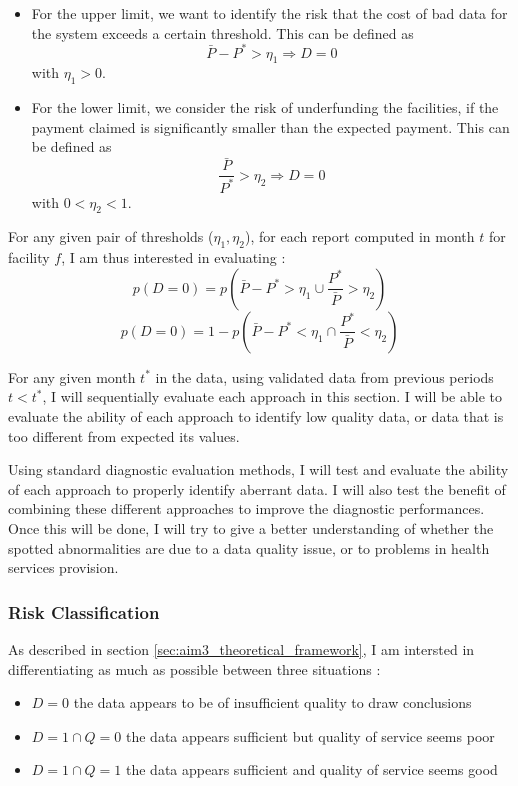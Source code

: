\begin{itemize}
\item For the upper limit, we want to identify the risk that the cost of bad data for the system exceeds a certain threshold. This can be defined as
$$ \bar{P} - P^{*} > \eta_1 \Rightarrow D = 0$$
with $\eta_1 > 0 $.

\item For the lower limit, we consider the risk of underfunding the facilities, if the payment claimed is significantly smaller than the expected payment. This can be defined as
$$  \frac{\bar{P}}{P^{*}} > \eta_2 \Rightarrow D = 0$$
with $0 < \eta_2 < 1 $.
\end{itemize}

For any given pair of thresholds ($\eta_1 , \eta_2$), for each report computed in month $t$ for facility $f$, I am thus interested in evaluating :
	$$p(D=0) = p(\bar{P} - P^{*} > \eta_1 \cup \frac{P^{*}}{\bar{P}} > \eta_2 ) $$
	$$p(D=0) = 1 - p(\bar{P} - P^{*} < \eta	_1 \cap \frac{P^{*}}{\bar{P}} < \eta_2 )$$

For any given month $t^{*}$ in the data, using validated data from previous periods $t < t^{*}$, I will sequentially evaluate each approach in this section. I will be able to evaluate the ability of each approach to identify low quality data, or data that is too different from expected its values.

\bigskip

Using standard diagnostic evaluation methods,  I will test and evaluate the ability of each approach to properly identify aberrant data. I will also test the benefit of combining these different approaches to improve the diagnostic performances. Once this will be done, I will try to give a better understanding of whether the spotted abnormalities are due to a data quality issue, or to problems in health services provision.

\subsubsection{Risk Classification}

As described in section \ref{sec:aim3_theoretical_framework}, I am intersted in differentiating as much as possible between three situations :
\begin{itemize}
	\item $D = 0$ the data appears to be of insufficient quality to draw conclusions
	\item $D = 1 \cap Q = 0$ the data appears sufficient but quality of service seems poor
	\item $D = 1 \cap Q = 1$ the data appears sufficient and quality of service seems good
\end{itemize}

